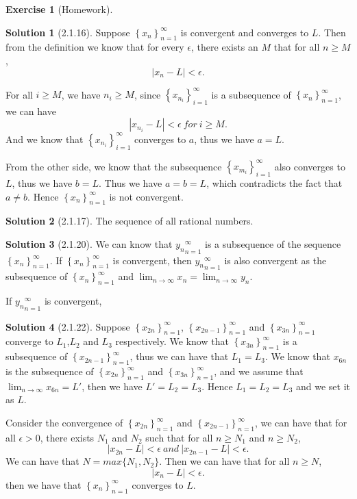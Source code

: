 \documentclass{article}
\theoremstyle{definition}
\newtheorem{exe}{Exercise}[section]
\newtheorem{sol}{Solution}[exe]
\begin{document}
\begin{exe}[Homework]
\end{exe}

\begin{sol}[2.1.16]

    Suppose $\left\{x_{n}\right\}_{n=1}^{\infty}$ is convergent and converges to $L$. Then from the definition we know that for every $\epsilon$, there exists an $M$ that for all $n\geq M$,
    $$ |x_{n}-L|<\epsilon.$$
    
    For all $i\geq M$, we have $n_{i}\geq M$, since $\left\{x_{n_{i}}\right\}_{i=1}^{\infty}$ is a subsequence of $\left\{x_{n}\right\}_{n=1}^{\infty}$, we can have 
    $$|x_{n_{i}}-L|<\epsilon\ for\ i\geq M.$$
    And we know that $\left\{x_{n_{i}}\right\}_{i=1}^{\infty}$ converges to $a$, thus we have $a=L$.
    
From the other side, we know that the subsequence $\left\{x_{m_{i}}\right\}_{i=1}^{\infty}$ also converges to $L$, thus we have $b=L$.
Thus we have $a=b=L$, which contradicts the fact that $a\neq b$.
Hence $\left\{x_{n}\right\}_{n=1}^{\infty}$ is not convergent.
\end{sol}

\begin{sol}[2.1.17]

The sequence of all rational numbers.
\end{sol}


\begin{sol}[2.1.20]
We can know that ${y_{n}}_{n=1}^{\infty}$ is a subsequence of the sequence $\left\{x_{n}\right\}_{n=1}^{\infty}$. If $\left\{x_{n}\right\}_{n=1}^{\infty}$ is 
convergent, then ${y_{n}}_{n=1}^{\infty}$ is also convergent as the subsequence of $\left\{x_{n}\right\}_{n=1}^{\infty}$ and $\lim_{n\to \infty}x_{n}=\lim_{n\to \infty}y_{n}$.

If ${y_{n}}_{n=1}^{\infty}$ is convergent, 

\end{sol}

\begin{sol}[2.1.22]

Suppose $\left\{x_{2n}\right\}_{n=1}^{\infty}$, $\left\{x_{2n-1}\right\}_{n=1}^{\infty}$ and $\left\{x_{3n}\right\}_{n=1}^{\infty}$ converge to $L_{1}$,$L_{2}$ and $L_{3}$ respectively. We know that $\left\{x_{3n}\right\}_{n=1}^{\infty}$ 
is a subsequence of $\left\{x_{2n-1}\right\}_{n=1}^{\infty}$, thus we can have that $L_{1}=L_{3}$. We know that ${x_{6n}}$ is the subsequence of $\left\{x_{2n}\right\}_{n=1}^{\infty}$ and $\left\{x_{3n}\right\}_{n=1}^{\infty}$, and we assume that 
$\lim_{n\to \infty}x_{6n}=L'$, then we have $L'=L_{2}=L_{3}$. Hence $L_{1}=L_{2}=L_{3}$ and we set it as $L$.

Consider the convergence of $\left\{x_{2n}\right\}_{n=1}^{\infty}$ and $\left\{x_{2n-1}\right\}_{n=1}^{\infty}$, we can have that for 
all $\epsilon>0$, there exists $N_{1}$ and $N_{2}$ such that for all $n\geq N_{1}$ and $n\geq N_{2}$,
$$|x_{2n}-L|<\epsilon\ and\ |x_{2n-1}-L|<\epsilon.$$
We can have that $N=max\{N_{1},N_{2}\}$. Then we can have that for all $n\geq N$,
$$|x_{n}-L|<\epsilon.$$
then we have that $\left\{x_{n}\right\}_{n=1}^{\infty}$ converges to $L$.
\end{sol}
\end{document}
